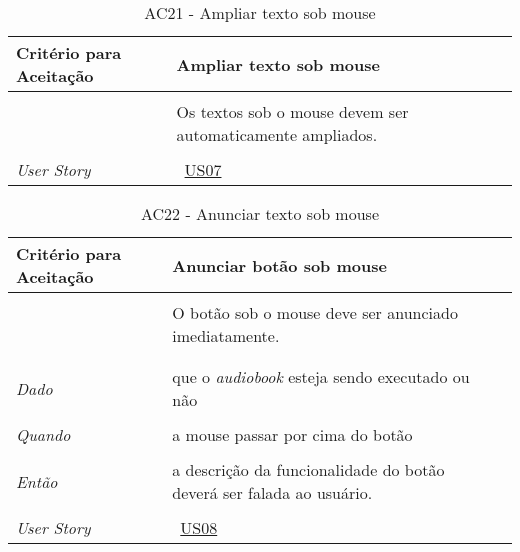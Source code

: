 \begin{apendicesenv}

\begin{table}[ht]
\centering
\caption{AC21 - Ampliar texto sob mouse}
\vspace{0.1cm}
\begin{center}
\begin{tabularx}{\textwidth}{|lX|l|}

\hline
\textbf{Critério para Aceitação} & Ampliar texto sob mouse \\
\hline
 & \\
 & Os textos sob o mouse devem ser automaticamente ampliados. \\
 & \\
\hline
\textit{User Story} & ~\hyperref[tab:us07]{US07} \\
\hline

\end{tabularx}
\end{center}
\label{tab:us01a21}
\end{table}


\begin{table}[ht]
\centering
\caption{AC22 - Anunciar texto sob mouse}
\vspace{0.1cm}
\begin{center}
\begin{tabularx}{\textwidth}{|lX|l|}

\hline
\textbf{Critério para Aceitação} & Anunciar botão sob mouse \\
\hline
 & \\
 & O botão sob o mouse deve ser anunciado imediatamente. \\
 & \\
  & \\
\textit{Dado} & que o \textit{audiobook} esteja sendo executado ou não \\
 & \\
\textit{Quando} & a mouse passar por cima do botão \\
 & \\
\textit{Então} & a descrição da funcionalidade do botão deverá ser falada ao usuário. \\
 & \\
\hline
\textit{User Story} & ~\hyperref[tab:us08]{US08} \\
\hline


\end{tabularx}
\end{center}
\end{table}
\end{apendicesenv}
